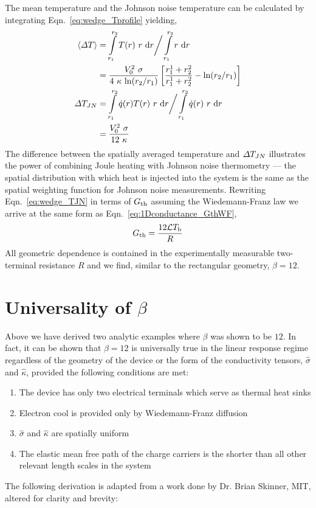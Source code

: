 The mean temperature and the Johnson noise temperature can be calculated by integrating Eqn.~\ref{eq:wedge_Tprofile} yielding,
\begin{align}
\langle\Delta T\rangle &= \int\limits_{r_1}^{r_2}T(r)~r~\mathrm{d}r \bigg/ \int\limits_{r_1}^{r_2}r~\mathrm{d}r \nonumber \\
 &=\frac{V_0^2~\sigma}{4~\kappa~\mathrm{ln}(r_2/r_1)}\left[\frac{r_1^1+r_2^2}{r_1^1+r_2^2}-\mathrm{ln}(r_2/r_1)\right] \\
\Delta T_{JN} &= \int\limits_{r_1}^{r_2}\dot{q}(r)T(r)~r~\mathrm{d}r \bigg/ \int\limits_{r_1}^{r_2}\dot{q}(r)~r~\mathrm{d}r \nonumber \\
 &= \frac{V_0^2~\sigma}{12~\kappa}\label{eq:wedge_TJN}
\end{align}
The difference between the spatially averaged temperature and $\Delta T_{JN}$ illustrates the power of combining Joule heating with Johnson noise thermometry --- the spatial distribution with which heat is injected into the system is the same as the spatial weighting function for Johnson noise measurements. Rewriting Eqn.~\ref{eq:wedge_TJN} in terms of $G_{\mathrm{th}}$ assuming the Wiedemann-Franz law we arrive at the same form as Eqn.~\ref{eq:1Dconductance_GthWF},
\begin{equation}\label{eq:wedge_GthWF}
G_{\mathrm{th}} = \frac{12\mathcal{L} T_\mathrm{b}}{R}
\end{equation}
All geometric dependence is contained in the experimentally measurable two-terminal resistance $R$ and we find, similar to the rectangular geometry, $\beta = 12$.

\section{Universality of $\beta$}
\label{section:beta}
Above we have derived two analytic examples where $\beta$ was shown to be $12$. In fact, it can be shown that $\beta = 12$ is universally true in the linear response regime regardless of the geometry of the device or the form of the conductivity tensors, $\hat\sigma$ and $\hat\kappa$, provided the following conditions are met:
\begin{enumerate}
\item The device has only two electrical terminals which serve as thermal heat sinks
\item Electron cool is provided only by Wiedemann-Franz diffusion
\item $\hat\sigma$ and $\hat\kappa$ are spatially uniform
\item The elastic mean free path of the charge carriers is the shorter than all other relevant length scales in the system
\end{enumerate}
The following derivation is adapted from a work done by Dr. Brian Skinner, MIT, altered for clarity and brevity:

